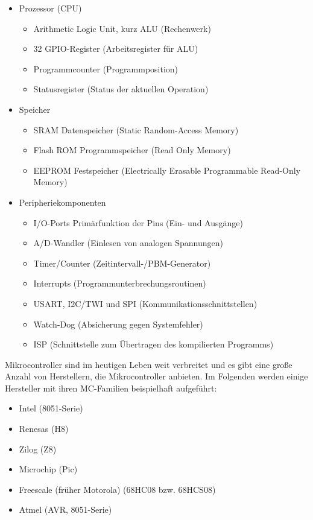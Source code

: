 \begin{itemize}
\item Prozessor (CPU)
\begin{itemize}
          \item Arithmetic Logic Unit, kurz ALU (Rechenwerk)
          \item 32 GPIO-Register (Arbeitsregister f\"ur ALU)
          \item Programmcounter (Programmposition)
					\item Statusregister (Status der aktuellen Operation) 
\end{itemize}
\item Speicher
\begin{itemize}
          \item SRAM Datenspeicher (Static Random-Access Memory)
					\item Flash ROM Programmspeicher (Read Only Memory)
					\item EEPROM Festspeicher (Electrically Erasable Programmable Read-Only Memory)
\end{itemize}
\item Peripheriekomponenten
    \begin{itemize}
          \item I/O-Ports Prim\"arfunktion der Pins (Ein- und Ausg\"ange)
          \item A/D-Wandler (Einlesen von analogen Spannungen)
          \item Timer/Counter (Zeitintervall-/PBM-Generator)
					\item Interrupts (Programmunterbrechungsroutinen)
					\item USART, I2C/TWI und SPI (Kommunikationsschnittstellen)
					\item Watch-Dog (Absicherung gegen Systemfehler)
					\item ISP (Schnittstelle zum \"{U}bertragen des kompilierten Programms)
	\end{itemize}
\end{itemize}
Mikrocontroller sind im heutigen Leben weit verbreitet und es gibt eine große Anzahl von Herstellern, die Mikrocontroller anbieten.
Im Folgenden werden einige Hersteller mit ihren MC-Familien beispielhaft aufgef\"uhrt:
\begin{itemize}
\item Intel (8051-Serie)
\item Renesas (H8)
\item Zilog (Z8)
\item Microchip (Pic)
\item Freescale (fr\"uher Motorola) (68HC08 bzw. 68HCS08)
\item Atmel (AVR, 8051-Serie)
\end{itemize}

